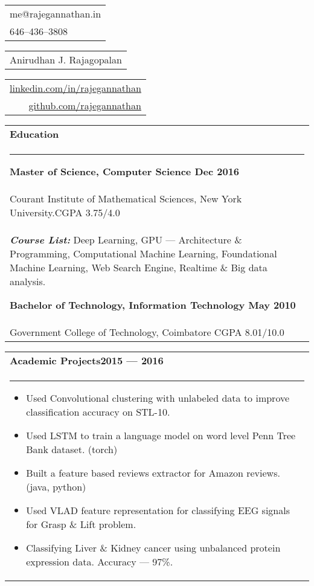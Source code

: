 \documentclass{article}
\begin{document}
{\small\begin{tabular}[c]{l}
        me@rajegannathan.in \\
        646--436--3808
\end{tabular}}\hfill%
{\Large\bfseries\begin{tabular}[c]{c}
        Anirudhan J. Rajagopalan
\end{tabular}}\hfill%
{\small\begin{tabular}[c]{r}
        \href{https://linkedin.com/in/rajegannathan}{linkedin.com/in/rajegannathan} \\
        \href{https://github.com/rajegannathan}{github.com/rajegannathan}
\end{tabular}}%


\bigskip

\begin{tabular}{p{\dimexpr\linewidth-2\tabcolsep}}
    \textbf{\large{Education}} \\
    \noindent\rule{\textwidth}{0.4pt}
    {\bfseries Master of Science, Computer Science \hfill Dec 2016} \\
    \quad Courant Institute of Mathematical Sciences, New York University.\hfill CGPA 3.75/4.0\\
    \quad \textbf{\textit{Course List:}} Deep Learning, GPU --- Architecture \& Programming, Computational Machine Learning, Foundational Machine Learning, Web Search Engine, Realtime \& Big data analysis.

    \bigskip
    {\bfseries Bachelor of Technology, Information Technology \hfill May 2010} \\
    \quad Government College of Technology, Coimbatore \hfill CGPA 8.01/10.0
\end{tabular}

\bigskip

\begin{tabular}{p{\dimexpr\linewidth-2\tabcolsep}}
    \bfseries \large{Academic Projects}\hfill 2015 --- 2016 \mdseries \\
    \noindent\rule{\textwidth}{0.4pt}
    \begin{itemize}
        \item Used Convolutional clustering with unlabeled data to improve classification accuracy on STL-10.
        \item Used LSTM to train a language model on word level Penn Tree Bank dataset. (torch)
        \item Built a feature based reviews extractor for Amazon reviews. (java, python)
        \item Used VLAD feature representation for classifying EEG signals for Grasp \& Lift problem.
        \item Classifying Liver \& Kidney cancer using unbalanced protein expression data. Accuracy --- 97\%.
    \end{itemize}
\end{tabular}
\end{document}
